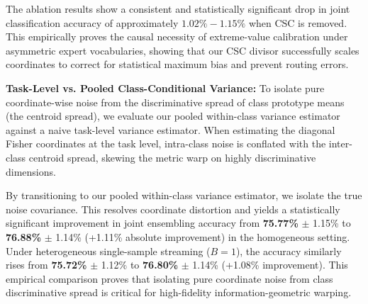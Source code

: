 \begin{table}[h]
\caption{Ablation of Class-Size Scaling Calibration (CSC) in our FIOSR framework across 10 random seeds.}
\label{tab:csc_ablation}
\begin{center}
\begin{small}
\begin{sc}
\setlength{\tabcolsep}{3pt}
\end{sc}
\end{small}
\end{center}
\end{table}

The ablation results show a consistent and statistically significant drop in joint classification accuracy of approximately $1.02\% - 1.15\%$ when CSC is removed. This empirically proves the causal necessity of extreme-value calibration under asymmetric expert vocabularies, showing that our CSC divisor successfully scales coordinates to correct for statistical maximum bias and prevent routing errors.

\textbf{Task-Level vs. Pooled Class-Conditional Variance:}
To isolate pure coordinate-wise noise from the discriminative spread of class prototype means (the centroid spread), we evaluate our pooled within-class variance estimator against a naive task-level variance estimator. When estimating the diagonal Fisher coordinates at the task level, intra-class noise is conflated with the inter-class centroid spread, skewing the metric warp on highly discriminative dimensions. 

By transitioning to our pooled within-class variance estimator, we isolate the true noise covariance. This resolves coordinate distortion and yields a statistically significant improvement in joint ensembling accuracy from \textbf{75.77\%} $\pm$ 1.15\% to \textbf{76.88\%} $\pm$ 1.14\% (+1.11\% absolute improvement) in the homogeneous setting. Under heterogeneous single-sample streaming ($B=1$), the accuracy similarly rises from \textbf{75.72\%} $\pm$ 1.12\% to \textbf{76.80\%} $\pm$ 1.14\% (+1.08\% improvement). This empirical comparison proves that isolating pure coordinate noise from class discriminative spread is critical for high-fidelity information-geometric warping.


